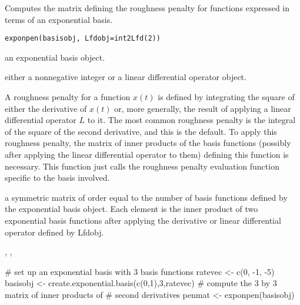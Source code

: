 \begin{Description}\relax
Computes the matrix defining the roughness penalty for functions
expressed in terms of an exponential basis.
\end{Description}
\begin{Usage}
\begin{verbatim}
exponpen(basisobj, Lfdobj=int2Lfd(2))
\end{verbatim}
\end{Usage}
\begin{Arguments}
\begin{ldescription}
\item[\code{basisobj}] an exponential basis object.

\item[\code{Lfdobj}] either a nonnegative integer or a linear differential operator object.

\end{ldescription}
\end{Arguments}
\begin{Details}\relax
A roughness penalty for a function $x(t)$ is defined by
integrating the square of either the derivative of  $ x(t) $ or,
more generally, the result of applying a linear differential operator
$L$ to it.  The most common roughness penalty is the integral of
the square of the second derivative, and
this is the default. To apply this roughness penalty, the matrix of
inner products of the basis functions (possibly after applying the
linear differential operator to them) defining this function
is necessary. This function just calls the roughness penalty evaluation
function specific to the basis involved.
\end{Details}
\begin{Value}
a symmetric matrix of order equal to the number of basis functions
defined by the exponential basis object.  Each element is the inner product
of two exponential basis functions after applying the derivative or linear
differential operator defined by Lfdobj.
\end{Value}
\begin{SeeAlso}\relax
{}, 
, 
\end{SeeAlso}
\begin{Examples}
\begin{ExampleCode}

#  set up an exponential basis with 3 basis functions
ratevec  <- c(0, -1, -5)
basisobj <- create.exponential.basis(c(0,1),3,ratevec)
#  compute the 3 by 3 matrix of inner products of
#  second derivatives
penmat <- exponpen(basisobj)

\end{ExampleCode}
\end{Examples}


